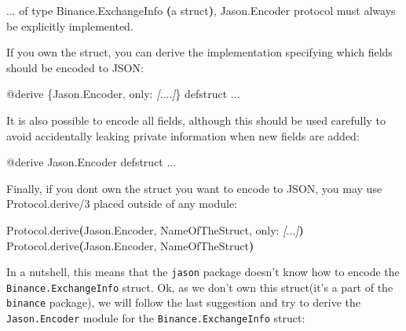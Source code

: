 \documentclass[
  oneside]{book}
\newenvironment{Shaded}{\begin{snugshade}}{\end{snugshade}}
\newcommand{\ErrorTok}[1]{\textcolor[rgb]{0.64,0.00,0.00}{\textbf{#1}}}
\newcommand{\ExtensionTok}[1]{#1}
\newcommand{\KeywordTok}[1]{\textcolor[rgb]{0.13,0.29,0.53}{\textbf{#1}}}
\newcommand{\NormalTok}[1]{#1}
\newcommand{\PreprocessorTok}[1]{\textcolor[rgb]{0.56,0.35,0.01}{\textit{#1}}}
\newcommand{\SpecialStringTok}[1]{\textcolor[rgb]{0.31,0.60,0.02}{#1}}
\begin{document}
\begin{Shaded}
\begin{Highlighting}[]
\ExtensionTok{...}\NormalTok{ of type Binance.ExchangeInfo }\ErrorTok{(}\ExtensionTok{a}\NormalTok{ struct}\KeywordTok{)}\ExtensionTok{,}\NormalTok{ Jason.Encoder protocol must always be}
\ExtensionTok{explicitly}\NormalTok{ implemented.}

\ExtensionTok{If}\NormalTok{ you own the struct, you can derive the implementation specifying which fields}
\ExtensionTok{should}\NormalTok{ be encoded to JSON:}

    \ExtensionTok{@derive}\NormalTok{ \{Jason.Encoder, only: }\PreprocessorTok{[}\SpecialStringTok{....}\PreprocessorTok{]}\NormalTok{\}}
    \ExtensionTok{defstruct}\NormalTok{ ...}

\ExtensionTok{It}\NormalTok{ is also possible to encode all fields, although this should be used carefully}
\ExtensionTok{to}\NormalTok{ avoid accidentally leaking private information when new fields are added:}

    \ExtensionTok{@derive}\NormalTok{ Jason.Encoder}
    \ExtensionTok{defstruct}\NormalTok{ ...}

\ExtensionTok{Finally,}\NormalTok{ if you dont own the struct you want to encode to JSON, you may use}
\ExtensionTok{Protocol.derive/3}\NormalTok{ placed outside of any module: }

    \ExtensionTok{Protocol.derive}\ErrorTok{(}\ExtensionTok{Jason.Encoder,}\NormalTok{ NameOfTheStruct, only: }\PreprocessorTok{[}\SpecialStringTok{...}\PreprocessorTok{]}\KeywordTok{)}
    \ExtensionTok{Protocol.derive}\ErrorTok{(}\ExtensionTok{Jason.Encoder,}\NormalTok{ NameOfTheStruct}\KeywordTok{)}
\end{Highlighting}
\end{Shaded}

In a nutshell, this means that the \texttt{jason} package doesn't know how to encode the \texttt{Binance.ExchangeInfo} struct. Ok, as we don't own this struct(it's a part of the \texttt{binance} package), we will follow the last suggestion and try to derive the \texttt{Jason.Encoder} module for the \texttt{Binance.ExchangeInfo} struct:
\end{document}
